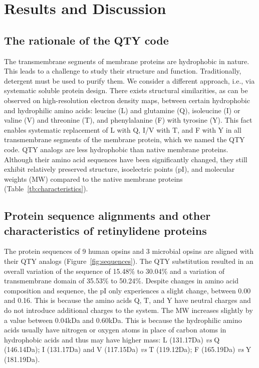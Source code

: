 \documentclass[fleqn, 10pt]{manuscript}
\begin{document}
\section*{Results and Discussion}

\subsection*{The rationale of the QTY code}

The transmembrane segments of membrane proteins are hydrophobic in nature. This leads to a challenge to study their structure and function. Traditionally, detergent must be used to purify them. We consider a different approach, i.e., via systematic soluble protein design. There exists structural similarities, as can be observed on high-resolution electron density maps, between certain hydrophobic and hydrophilic amino acids: leucine (L) and glutamine (Q), isoleucine (I) or valine (V) and threonine (T), and phenylalanine (F) with tyrosine (Y). This fact enables systematic replacement of L with Q, I/V with T, and F with Y in all transmembrane segments of the membrane protein, which we named the QTY code. QTY analogs are less hydrophobic than native membrane proteins. Although their amino acid sequences have been significantly changed, they still exhibit relatively preserved structure, isoelectric points (pI), and molecular weights (MW) compared to the native membrane proteins (Table~\ref{tb:characteristics}). 

\subsection*{Protein sequence alignments and other characteristics of retinylidene proteins}

The protein sequences of 9 human opsins and 3 microbial opsins are aligned with their QTY analogs (Figure~\ref{fig:sequences}). The QTY substitution resulted in an overall variation of the sequence of 15.48\% to 30.04\% and a variation of transmembrane domain of 35.53\% to 50.24\%. Despite changes in amino acid composition and sequence, the pI only experiences a slight change, between 0.00 and 0.16. This is because the amino acids Q, T, and Y have neutral charges and do not introduce additional charges to the system.  The MW increases slightly by a value between 0.04kDa and 0.60kDa. This is because the hydrophilic amino acids usually have nitrogen or oxygen atoms in place of carbon atoms in hydrophobic acids and thus may have higher mass: L (131.17Da) \textit{vs} Q (146.14Da); I (131.17Da) and V (117.15Da) \textit{vs} T (119.12Da); F (165.19Da) \textit{vs} Y (181.19Da). 
\end{document}
